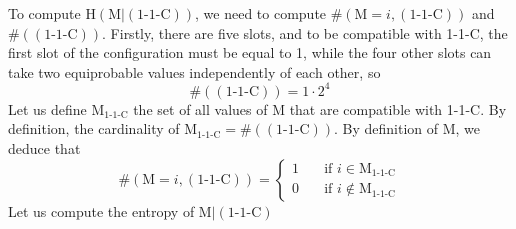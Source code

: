 \documentclass{article}
\begin{document}
To compute $\mbox{H}(\mbox{M}|(\mbox{1-1-C}))$, we need to compute $\#(\mbox{M}=i, (\mbox{1-1-C}))$ and $\#((\mbox{1-1-C}))$. Firstly, there are five slots, and to be compatible with 1-1-C, the first slot of the configuration must be equal to 1, while the four other slots can take two equiprobable values independently of each other, so
$$
\#((\mbox{1-1-C}))=1\cdot2^4
$$
Let us define $\mbox{M}_{\mbox{1-1-C}}$ the set of all values of M that are compatible with 1-1-C. By definition, the cardinality of $\mbox{M}_{\mbox{1-1-C}} = \#((\mbox{1-1-C}))$. By definition of M, we deduce that
$$
\#(\mbox{M}=i, (\mbox{1-1-C}))=
\begin{cases}
       1 &\quad\text{if } i \in \mbox{M}_{\mbox{1-1-C}} \\
       0 &\quad\text{if } i \not\in \mbox{M}_{\mbox{1-1-C}}
     \end{cases}
$$
Let us compute the entropy of $\mbox{M}|(\mbox{1-1-C})$
\end{document}
